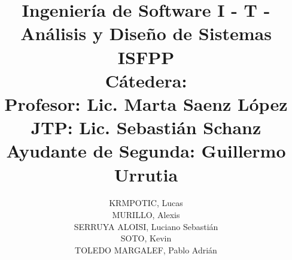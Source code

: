 \documentclass[12pt]{extarticle}
\begin{document}
        \title{Ingeniería de Software I - T - Análisis y Diseño de Sistemas\\
        ISFPP\\
        \large{C\'atedera:\\
        Profesor: Lic. Marta Saenz López\\
        JTP: Lic. Sebastián Schanz\\
        Ayudante de Segunda: Guillermo Urrutia}}
        \author{KRMPOTIC, Lucas\\
        MURILLO, Alexis\\
        SERRUYA ALOISI, Luciano Sebastián\\
        SOTO, Kevin\\
        TOLEDO MARGALEF, Pablo Adrián}
        \date{}
        \maketitle
        \pagebreak

        \pagestyle{fancy}
        \fancyhf{}
        \lfoot{\thepage}

        \tableofcontents


        \clearpage
\end{document}
